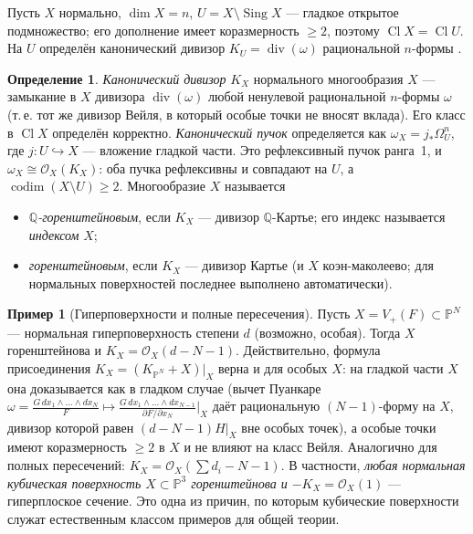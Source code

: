 \documentclass[11pt,a4paper]{article}
\theoremstyle{plain}
\theoremstyle{definition}
\newtheorem{definition}[theorem]{Определение}
\newtheorem{example}[theorem]{Пример}
\theoremstyle{remark}
\newcommand{\Q}{\mathbb{Q}}
\newcommand{\PP}{\mathbb{P}}
\newcommand{\cO}{\mathcal{O}}
\DeclareMathOperator{\Cl}{Cl}
\DeclareMathOperator{\divv}{div}
\DeclareMathOperator{\codim}{codim}
\DeclareMathOperator{\Sing}{Sing}
\begin{document}
Пусть $X$ нормально, $\dim X=n$, $U=X\setminus\Sing X$ --- гладкое открытое подмножество; его
дополнение имеет коразмерность $\ge2$, поэтому $\Cl X=\Cl U$. На $U$ определён канонический дивизор
$K_U=\divv(\omega)$ рациональной $n$-формы \cite[II.8]{Ha}.

\begin{definition}
\emph{Канонический дивизор} $K_X$ нормального многообразия $X$ --- замыкание в $X$ дивизора
$\divv(\omega)$ любой ненулевой рациональной $n$-формы $\omega$ (т.\,е. тот же дивизор Вейля, в
который особые точки не вносят вклада). Его класс в $\Cl X$ определён корректно. \emph{Канонический
пучок} определяется как $\omega_X=j_*\Omega^n_U$, где $j\colon U\hookrightarrow X$ --- вложение
гладкой части. Это рефлексивный пучок ранга~1, и $\omega_X\cong\cO_X(K_X)$: оба пучка рефлексивны
и совпадают на $U$, а $\codim(X\setminus U)\ge2$.
Многообразие $X$ называется
\begin{itemize}
\item \emph{$\Q$-горенштейновым}, если $K_X$ --- дивизор $\Q$-Картье; его индекс называется
\emph{индексом} $X$;
\item \emph{горенштейновым}, если $K_X$ --- дивизор Картье (и $X$ коэн-маколеево; для нормальных
поверхностей последнее выполнено автоматически).
\end{itemize}
\end{definition}

\begin{example}[Гиперповерхности и полные пересечения]\label{ex:hyp-Gor}
Пусть $X=V_+(F)\subset\PP^N$ --- нормальная гиперповерхность степени $d$ (возможно, особая).
Тогда $X$ горенштейнова и $K_X=\cO_X(d-N-1)$. Действительно, формула присоединения
$K_X=(K_{\PP^N}+X)|_X$ верна и для особых $X$: на гладкой части $X$ она доказывается как в
гладком случае (вычет Пуанкаре $\omega=\frac{G\,dx_1\wedge\dots\wedge dx_N}{F}\mapsto
\frac{G\,dx_1\wedge\dots\wedge dx_{N-1}}{\partial F/\partial x_N}\big|_X$ даёт рациональную
$(N-1)$-форму на $X$, дивизор которой равен $(d-N-1)H|_X$ вне особых точек), а особые точки имеют
коразмерность $\ge2$ в $X$ и не влияют на класс Вейля. Аналогично для полных пересечений:
$K_X=\cO_X(\sum d_i-N-1)$. В частности, \emph{любая нормальная кубическая поверхность
$X\subset\PP^3$ горенштейнова и $-K_X=\cO_X(1)$} --- гиперплоское сечение. Это одна из причин,
по которым кубические поверхности служат естественным классом примеров для общей теории.
\end{example}
\end{document}

